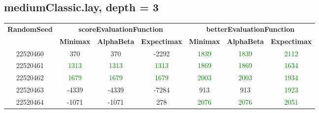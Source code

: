 \documentclass[english, a4paper,12pt]{article}
\begin{document}
\subsection*{mediumClassic.lay, depth = 3}
\small\begin{tabular}{|c|c|c|c|c|c|c|}
\hline
\textbf{RandomSeed} & \multicolumn{3}{c|}{\textbf{scoreEvaluationFunction}} & \multicolumn{3}{c|}{\textbf{betterEvaluationFunction}} \\
\cline{2-7}
& \textbf{Minimax} & \textbf{AlphaBeta} & \textbf{Expectimax} & \textbf{Minimax} & \textbf{AlphaBeta} & \textbf{Expectimax} \\
\hline
22520460 & \textcolor{red!70}{370} & \textcolor{red!70}{370} & \textcolor{red!70}{-2292} & \textcolor{Green}{1839} & \textcolor{Green}{1839} & \textcolor{Green}{2112} \\
22520461 & \textcolor{Green}{1313} & \textcolor{Green}{1313} & \textcolor{Green}{1313} & \textcolor{Green}{1869} & \textcolor{Green}{1869} & \textcolor{Green}{1634} \\
22520462 & \textcolor{Green}{1679} & \textcolor{Green}{1679} & \textcolor{Green}{1679} & \textcolor{Green}{2003} & \textcolor{Green}{2003} & \textcolor{Green}{1934} \\
22520463 & \textcolor{red!70}{-4339} & \textcolor{red!70}{-4339} & \textcolor{red!70}{-7284} & \textcolor{red!70}{913} & \textcolor{red!70}{913} & \textcolor{Green}{1923} \\
22520464 & \textcolor{red!70}{-1071} & \textcolor{red!70}{-1071} & \textcolor{red!70}{278} & \textcolor{Green}{2076} & \textcolor{Green}{2076} & \textcolor{Green}{2051} \\
\hline
\end{tabular}
\end{document}
